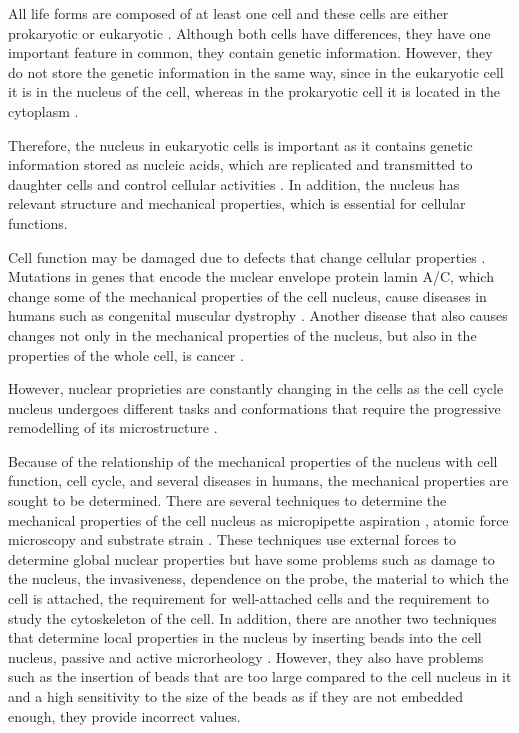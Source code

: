 \documentclass[12pt, a4paper]{article} %
\begin{document}
All life forms are composed of at least one cell \cite{mazzarello1999unifying} and these cells are either prokaryotic or eukaryotic \cite{vellai1999origin}. Although both cells have differences, they have one important feature in common, they contain genetic information. However, they do not store the genetic information in the same way, since in the eukaryotic cell it is in the nucleus of the cell, whereas in the prokaryotic cell it is located in the cytoplasm \cite{cook1983mucus}.

\setlength{\parskip}{4mm}

Therefore, the nucleus in eukaryotic cells is important as it contains genetic information stored as nucleic acids, which are replicated and transmitted to daughter cells and control cellular activities \cite{ossareh2001protein}. In addition, the nucleus has relevant structure and mechanical properties, which is essential for cellular functions. 

Cell function may be damaged due to defects that change cellular properties \cite{lammerding2011mechanics}. Mutations in genes that encode the nuclear envelope protein lamin A/C, which change some of the mechanical properties of the cell nucleus, cause diseases in humans such as congenital muscular dystrophy \cite{lammerding2004lamin}. Another disease that also causes changes not only in the mechanical properties of the nucleus, but also in the properties of the whole cell, is cancer \cite{jacobs2012introduction, lekka2019measuring, cross2007nanomechanical}.

However, nuclear proprieties are constantly changing in the cells as the cell cycle nucleus undergoes different tasks and conformations that require the progressive remodelling of its microstructure \cite{liu2017mitosis}.

Because of the relationship of the mechanical properties of the nucleus with cell function, cell cycle, and several diseases in humans, the mechanical properties are sought to be determined. There are several techniques to determine the mechanical properties of the cell nucleus as micropipette aspiration \cite{gonzalez2019advances}, atomic force microscopy \cite{janel2019stiffness} and substrate strain \cite{murphy2011automated}. These techniques use external forces to determine global nuclear properties but have some problems such as damage to the nucleus, the invasiveness, dependence on the probe, the material to which the cell is attached, the requirement for well-attached cells and the requirement to study the cytoskeleton of the cell. In addition, there are another two techniques that determine local properties in the nucleus by inserting beads into the cell nucleus, passive and active microrheology \cite{lammerding2011mechanics, lammerding2007nuclear, de2007direct}. However, they also have problems such as the insertion of beads that are too large compared to the cell nucleus in it and a high sensitivity to the size of the beads as if they are not embedded enough, they provide incorrect values.
\end{document}

